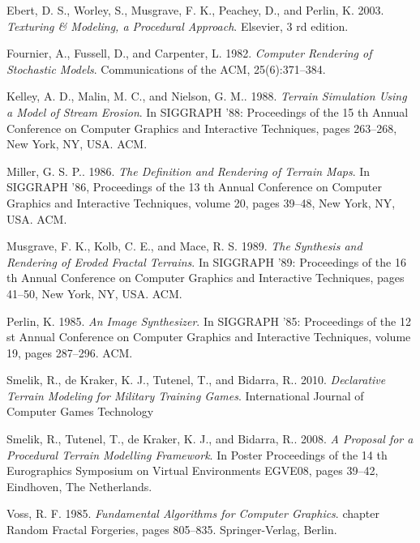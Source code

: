\documentclass[11pt]{report}
\begin{document}
\newpage
\begin{thebibliography}{2} 

Ebert, D. S., Worley, S., Musgrave, F. K., Peachey, D., and Perlin, K. 2003.
\textit{Texturing \& Modeling, a Procedural Approach}.
Elsevier, 3 rd edition.

Fournier, A., Fussell, D., and Carpenter, L. 1982.
\textit{Computer Rendering of Stochastic Models}.
Communications of the ACM, 25(6):371–384.

Kelley, A. D., Malin, M. C., and Nielson, G. M.. 1988.
\textit{Terrain Simulation Using a Model of Stream Erosion}.
In SIGGRAPH ’88: Proceedings of the 15 th Annual Conference on Computer
Graphics and Interactive Techniques, pages 263–268, New York, NY, USA. ACM.

Miller, G. S. P.. 1986.
\textit{The Definition and Rendering of Terrain Maps}.
In SIGGRAPH ’86, Proceedings of the 13 th Annual Conference on Computer Graphics and Interactive Techniques, volume 20, pages 39–48, New York, NY, USA. ACM.

Musgrave, F. K., Kolb, C. E., and Mace, R. S. 1989.
\textit{The Synthesis and Rendering of Eroded Fractal Terrains}.
In SIGGRAPH ’89: Proceedings of the 16 th Annual Conference on Computer
Graphics and Interactive Techniques, pages 41–50, New York, NY, USA. ACM.

Perlin, K. 1985.
\textit{An Image Synthesizer}.
In SIGGRAPH ’85: Proceedings of the 12 st Annual Conference on Computer Graphics and Interactive Techniques, volume 19, pages 287–296. ACM.

Smelik, R., de Kraker, K. J., Tutenel, T., and Bidarra, R.. 2010.
\textit{Declarative Terrain Modeling for Military Training Games}.
International Journal of Computer Games Technology

Smelik, R., Tutenel, T., de Kraker, K. J., and Bidarra, R.. 2008.
\textit{A Proposal for a Procedural Terrain Modelling Framework}.
In Poster Proceedings of the 14 th Eurographics Symposium on Virtual Environments EGVE08, pages 39–42, Eindhoven, The Netherlands.

Voss, R. F. 1985.
\textit{Fundamental Algorithms for Computer Graphics}.
chapter Random Fractal Forgeries, pages 805–835. Springer-Verlag, Berlin.

\end{thebibliography}
\end{document}
